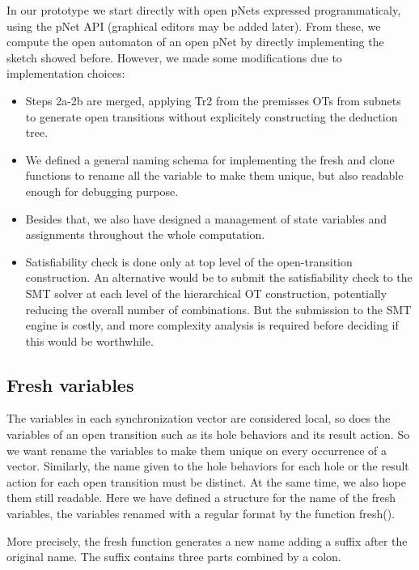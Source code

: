 \documentclass{lncs/llncs}
\begin{document}
In our prototype we start directly with open pNets expressed
programmaticaly, using the pNet API (graphical editors may be added
later). From these, we compute
the open automaton of an open pNet by directly
implementing the sketch showed before. However, we made some
modifications due to implementation choices:
\begin{itemize}
  \item Steps 2a-2b are merged, applying Tr2 from the
premisses OTs from subnets to generate open transitions without
explicitely constructing the deduction tree.
  \item We defined a general naming schema for implementing the fresh 
and clone functions to rename all the variable to make them unique, but also
readable enough for debugging purpose.
  \item Besides that, we also have designed a management of state variables and
    assignments throughout the whole computation.
  \item Satisfiability check is done only at
top level of the open-transition construction. An alternative would be
to submit the satisfiability check to the SMT solver at each level of
the hierarchical OT construction, potentially reducing the overall number of
combinations. But the submission to the SMT engine is costly, and more
complexity analysis is required before deciding if this would be
worthwhile. 
\end{itemize}


\subsection{Fresh variables}

The variables in each synchronization vector are considered local, so
does the variables of an open transition such as its hole behaviors
and its result action. So we want rename the variables to make them
unique on every occurrence of a vector. Similarly, the name given to
the hole behaviors for each hole or the result action for each open
transition must be distinct. At the same time, we also hope them still
readable. Here we have defined a structure for the name of the fresh
variables, the variables renamed with a regular format by the function
fresh(). 


More precisely, the fresh function generates a new name adding a
suffix after the original name. The suffix contains three parts
combined by a colon.  
\end{document}
